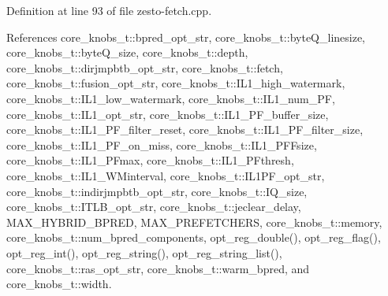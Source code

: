 Definition at line 93 of file zesto-fetch.cpp.

References core\_\-knobs\_\-t::bpred\_\-opt\_\-str, core\_\-knobs\_\-t::byteQ\_\-linesize, core\_\-knobs\_\-t::byteQ\_\-size, core\_\-knobs\_\-t::depth, core\_\-knobs\_\-t::dirjmpbtb\_\-opt\_\-str, core\_\-knobs\_\-t::fetch, core\_\-knobs\_\-t::fusion\_\-opt\_\-str, core\_\-knobs\_\-t::IL1\_\-high\_\-watermark, core\_\-knobs\_\-t::IL1\_\-low\_\-watermark, core\_\-knobs\_\-t::IL1\_\-num\_\-PF, core\_\-knobs\_\-t::IL1\_\-opt\_\-str, core\_\-knobs\_\-t::IL1\_\-PF\_\-buffer\_\-size, core\_\-knobs\_\-t::IL1\_\-PF\_\-filter\_\-reset, core\_\-knobs\_\-t::IL1\_\-PF\_\-filter\_\-size, core\_\-knobs\_\-t::IL1\_\-PF\_\-on\_\-miss, core\_\-knobs\_\-t::IL1\_\-PFFsize, core\_\-knobs\_\-t::IL1\_\-PFmax, core\_\-knobs\_\-t::IL1\_\-PFthresh, core\_\-knobs\_\-t::IL1\_\-WMinterval, core\_\-knobs\_\-t::IL1PF\_\-opt\_\-str, core\_\-knobs\_\-t::indirjmpbtb\_\-opt\_\-str, core\_\-knobs\_\-t::IQ\_\-size, core\_\-knobs\_\-t::ITLB\_\-opt\_\-str, core\_\-knobs\_\-t::jeclear\_\-delay, MAX\_\-HYBRID\_\-BPRED, MAX\_\-PREFETCHERS, core\_\-knobs\_\-t::memory, core\_\-knobs\_\-t::num\_\-bpred\_\-components, opt\_\-reg\_\-double(), opt\_\-reg\_\-flag(), opt\_\-reg\_\-int(), opt\_\-reg\_\-string(), opt\_\-reg\_\-string\_\-list(), core\_\-knobs\_\-t::ras\_\-opt\_\-str, core\_\-knobs\_\-t::warm\_\-bpred, and core\_\-knobs\_\-t::width.